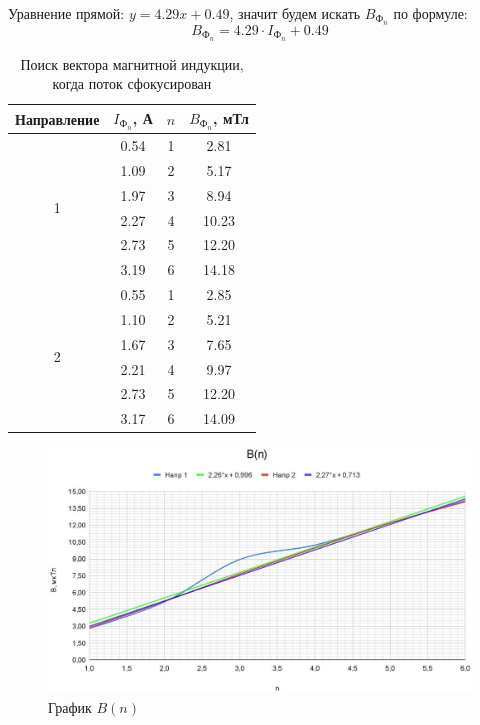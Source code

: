 \documentclass[a4paper]{article}
\begin{document}
Уравнение прямой: $y = 4.29x + 0.49$, значит будем искать $B_{\text{Ф}_n}$ по формуле:
\[B_{\text{Ф}_n} = 4.29 \cdot I_{\text{Ф}_n} + 0.49\]

\begin{table}
\begin{center}
\caption{Поиск вектора магнитной индукции, когда поток сфокусирован}
\begin{tabular}{|c|c|c|c|}
\hline 
Направление & $I_{\text{Ф}_n}$, А & $n$ & $B_{\text{Ф}_n}$, мТл \\ 
\hline 
\multirow{6}{*}{1} & 0.54 & 1 & 2.81 \\ 
\cline{2-4}
 & 1.09 & 2 & 5.17 \\ 
\cline{2-4}
 & 1.97 & 3 & 8.94 \\ 
\cline{2-4}
 & 2.27 & 4 & 10.23 \\ 
\cline{2-4}
 & 2.73 & 5 & 12.20 \\ 
\cline{2-4}
 & 3.19 & 6 & 14.18 \\ 
\hline 
\multirow{6}{*}{2} & 0.55 & 1 & 2.85 \\ 
\cline{2-4}
 & 1.10 & 2 & 5.21 \\ 
\cline{2-4}
 & 1.67 & 3 & 7.65 \\ 
\cline{2-4}
 & 2.21 & 4 & 9.97 \\ 
\cline{2-4}
 & 2.73 & 5 & 12.20 \\ 
\cline{2-4}
 & 3.17 & 6 & 14.09 \\ 
\hline 
\end{tabular} 
\end{center}
\end{table}

\begin{figure}[h]
\begin{center}
	\includegraphics[width = \textwidth]{B(n)}
	\caption{График $B(n)$}
\end{center}
\end{figure}
\end{document}
